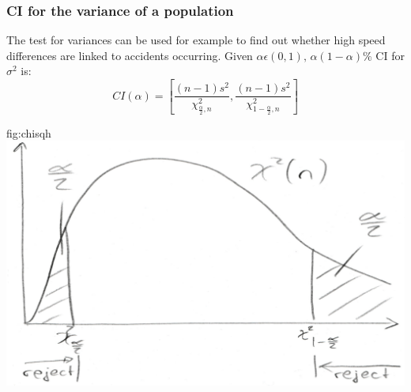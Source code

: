 	\subsubsection{CI for the variance of a population}	
		The test for variances can be used for example to find out whether high speed differences are linked to accidents occurring. Given $\alpha\epsilon(0,1),\,\alpha(1-\alpha)\%$ CI for $\sigma^2$ is:
		\begin{equation*}	
			CI(\alpha)=\left[\frac{(n-1)s^2}{\chi^2_{\frac{\alpha}{2},n}},\frac{(n-1)s^2}{\chi^2_{1-\frac{\alpha}{2},n}}\right]
		\end{equation*}
		\begin{fig}{fig:chisq}{h}
			\includegraphics[width=\textwidth]{P14chisq.png}
		\end{fig}			

